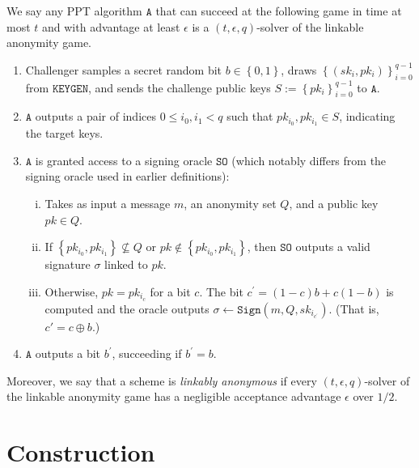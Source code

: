 \documentclass{llncs}
\newcommand{\A}{\texttt{A}}
\begin{document}
\begin{definition}\label{linkable-anonymity-game}
We say any PPT algorithm $\A$ that can succeed at the following game in time at most $t$ and with advantage at least $\epsilon$ is a $(t, \epsilon, q)$-solver of the linkable anonymity game.
\begin{enumerate}
\item Challenger samples a secret random bit $b \in \left\{0,1\right\}$, draws $\left\{(sk_i, pk_i)\right\}_{i=0}^{q-1}$ from $\texttt{KEYGEN}$, and sends the challenge public keys $S := \left\{pk_i\right\}_{i=0}^{q-1}$ to $\A$.

\item $\A$ outputs a pair of indices $0 \leq i_0, i_1 < q$ such that $pk_{i_0}, pk_{i_1} \in S$, indicating the target keys.

\item  $\A$ is granted access to a signing oracle $\texttt{SO}$ (which notably differs from the signing oracle used in earlier definitions):
    \begin{enumerate}[(i)]
    \item Takes as input a message $m$, an anonymity set $Q$, and a public key $pk \in Q$.

    \item If $\left\{pk_{i_0}, pk_{i_1}\right\} \not\subseteq Q$ or $pk \notin \left\{pk_{i_0}, pk_{i_1}\right\}$, then $\texttt{SO}$ outputs a valid signature $\sigma$ linked to $pk$.

    \item Otherwise, $pk = pk_{i_c}$ for a bit $c$. The bit $c^\prime = (1-c)b + c(1-b)$ is computed and the oracle outputs $\sigma \leftarrow \texttt{Sign}(m, Q, sk_{i_{c^\prime}})$. (That is, $c' = c \oplus b$.)
    \end{enumerate}

\item $\A$ outputs a bit $b^\prime$, succeeding if $b^\prime = b$.
\end{enumerate}
Moreover, we say that a scheme is \textit{linkably anonymous} if every $(t, \epsilon, q)$-solver of the linkable anonymity game has a negligible acceptance advantage $\epsilon$ over $1/2$.
\end{definition}


\section{Construction}\label{sec:implementation}
\end{document}
